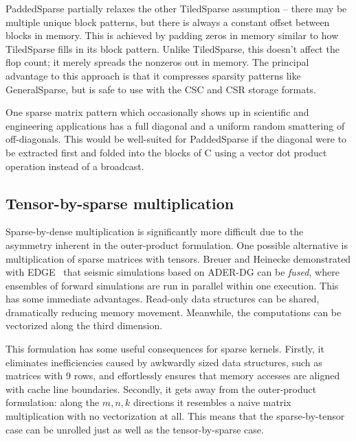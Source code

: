   PaddedSparse partially relaxes the other TiledSparse assumption -- there may be multiple unique block patterns, but there is always a constant offset between blocks in memory. This is achieved by padding zeros in memory similar to how TiledSparse fills in its block pattern. Unlike TiledSparse, this doesn't affect the flop count; it merely spreads the nonzeros out in memory. The principal advantage to this approach is that it compresses sparsity patterns like GeneralSparse, but is safe to use with the CSC and CSR storage formats. 

  One sparse matrix pattern which occasionally shows up in scientific and engineering applications has a full diagonal and a uniform random smattering of off-diagonals. This would be well-suited for PaddedSparse if the diagonal were to be extracted first and folded into the blocks of C using a vector dot product operation instead of a broadcast.


\subsection{Tensor-by-sparse multiplication}

Sparse-by-dense multiplication is significantly more difficult due to the asymmetry inherent in the outer-product formulation. One possible alternative is multiplication of sparse matrices with tensors. Breuer and Heinecke demonstrated with EDGE~\cite{10.1007/978-3-319-58667-0_3} that seismic simulations based on ADER-DG can be \emph{fused}, where ensembles of forward simulations are run in parallel within one execution. This has some immediate advantages. Read-only data structures can be shared, dramatically reducing memory movement. Meanwhile, the computations can be vectorized along the third dimension.

This formulation has some useful consequences for sparse kernels. Firstly, it eliminates inefficiencies caused by awkwardly sized data structures, such as matrices with 9 rows, and effortlessly ensures that memory accesses are aligned with cache line boundaries. Secondly, it gets away from the outer-product formulation: along the $m,n,k$ directions it resembles a naive matrix multiplication with no vectorization at all. This means that the sparse-by-tensor case can be unrolled just as well as the tensor-by-sparse case. 




